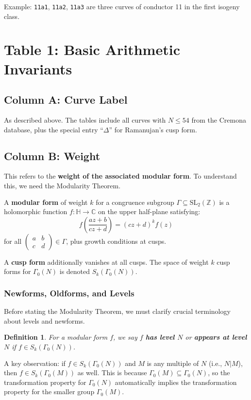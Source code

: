 \documentclass[11pt]{article}
\newtheorem{definition}[theorem]{Definition}
\begin{document}
Example: \texttt{11a1}, \texttt{11a2}, \texttt{11a3} are three curves of conductor 11 in the first isogeny class.

\section{Table 1: Basic Arithmetic Invariants}

\subsection{Column A: Curve Label}

As described above. The tables include all curves with $N \leq 54$ from the Cremona database, plus the special entry ``$\Delta$'' for Ramanujan's cusp form.

\subsection{Column B: Weight}

This refers to the \textbf{weight of the associated modular form}. To understand this, we need the Modularity Theorem.

A \textbf{modular form} of weight $k$ for a congruence subgroup $\Gamma \subseteq \text{SL}_2(\mathbb{Z})$ is a holomorphic function $f: \mathbb{H} \to \mathbb{C}$ on the upper half-plane satisfying:
$$f\left(\frac{az+b}{cz+d}\right) = (cz+d)^k f(z)$$
for all $\begin{pmatrix} a & b \\ c & d \end{pmatrix} \in \Gamma$, plus growth conditions at cusps.

A \textbf{cusp form} additionally vanishes at all cusps. The space of weight $k$ cusp forms for $\Gamma_0(N)$ is denoted $S_k(\Gamma_0(N))$.

\subsubsection{Newforms, Oldforms, and Levels}

Before stating the Modularity Theorem, we must clarify crucial terminology about levels and newforms.

\begin{definition}
For a modular form $f$, we say $f$ \textbf{has level $N$} or \textbf{appears at level $N$} if $f \in S_k(\Gamma_0(N))$.
\end{definition}

A key observation: if $f \in S_k(\Gamma_0(N))$ and $M$ is any multiple of $N$ (i.e., $N | M$), then $f \in S_k(\Gamma_0(M))$ as well. This is because $\Gamma_0(M) \subseteq \Gamma_0(N)$, so the transformation property for $\Gamma_0(N)$ automatically implies the transformation property for the smaller group $\Gamma_0(M)$.
\end{document}
